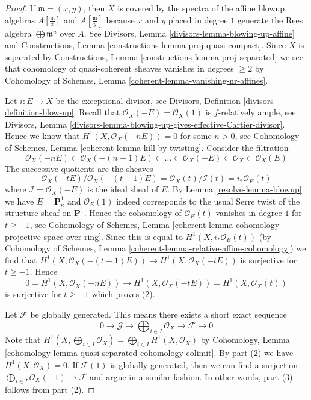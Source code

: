 \begin{proof}

If $\mathfrak m = (x, y)$, then $X$ is covered by the spectra
of the affine blowup algebras $A[\frac{\mathfrak m}{x}]$ and
$A[\frac{\mathfrak m}{y}]$ because $x$ and $y$ placed in degree $1$
generate the Rees algebra $\bigoplus \mathfrak m^n$ over $A$.
See Divisors, Lemma \ref{divisors-lemma-blowing-up-affine} and
Constructions, Lemma \ref{constructions-lemma-proj-quasi-compact}.
Since $X$ is separated by
Constructions, Lemma \ref{constructions-lemma-proj-separated}
we see that cohomology of quasi-coherent sheaves vanishes in
degrees $\geq 2$ by Cohomology of Schemes, Lemma
\ref{coherent-lemma-vanishing-nr-affines}.

\medskip\noindent
Let $i : E \to X$ be the exceptional divisor, see
Divisors, Definition \ref{divisors-definition-blow-up}.
Recall that $\mathcal{O}_X(-E) = \mathcal{O}_X(1)$ is
$f$-relatively ample, see
Divisors, Lemma \ref{divisors-lemma-blowing-up-gives-effective-Cartier-divisor}.
Hence we know that $H^1(X, \mathcal{O}_X(-nE)) = 0$ for some $n > 0$,
see Cohomology of Schemes, Lemma \ref{coherent-lemma-kill-by-twisting}.
Consider the filtration
$$
\mathcal{O}_X(-nE) \subset \mathcal{O}_X(-(n - 1)E) \subset
\ldots \subset \mathcal{O}_X(-E) \subset \mathcal{O}_X \subset \mathcal{O}_X(E)
$$
The successive quotients are the sheaves
$$
\mathcal{O}_X(-t E)/\mathcal{O}_X(-(t + 1)E) =
\mathcal{O}_X(t)/\mathcal{I}(t) =
i_*\mathcal{O}_E(t)
$$
where $\mathcal{I} = \mathcal{O}_X(-E)$ is the ideal sheaf of $E$.
By Lemma \ref{resolve-lemma-blowup} we have $E = \mathbf{P}^1_\kappa$ and
$\mathcal{O}_E(1)$ indeed corresponds to the usual Serre twist of
the structure sheaf on $\mathbf{P}^1$. Hence the cohomology
of $\mathcal{O}_E(t)$ vanishes in degree $1$ for $t \geq -1$, see
Cohomology of Schemes, Lemma
\ref{coherent-lemma-cohomology-projective-space-over-ring}.
Since this is equal to $H^1(X, i_*\mathcal{O}_E(t))$ (by
Cohomology of Schemes, Lemma \ref{coherent-lemma-relative-affine-cohomology})
we find that $H^1(X, \mathcal{O}_X(-(t + 1)E)) \to H^1(X, \mathcal{O}_X(-tE))$
is surjective for $t \geq -1$. Hence
$$
0 = H^1(X, \mathcal{O}_X(-nE))
\longrightarrow
H^1(X, \mathcal{O}_X(-tE)) = H^1(X, \mathcal{O}_X(t))
$$
is surjective for $t \geq -1$ which proves (2).

\medskip\noindent
Let $\mathcal{F}$ be globally generated. This means there exists
a short exact sequence
$$
0 \to \mathcal{G} \to \bigoplus\nolimits_{i \in I} \mathcal{O}_X
\to \mathcal{F} \to 0
$$
Note that $H^1(X, \bigoplus_{i \in I} \mathcal{O}_X) =
\bigoplus_{i \in I} H^1(X, \mathcal{O}_X)$ by
Cohomology, Lemma \ref{cohomology-lemma-quasi-separated-cohomology-colimit}.
By part (2) we have $H^1(X, \mathcal{O}_X) = 0$.
If $\mathcal{F}(1)$ is globally generated, then we can find a
surjection $\bigoplus_{i \in I} \mathcal{O}_X(-1) \to \mathcal{F}$
and argue in a similar fashion.
In other words, part (3) follows from part (2).


\end{proof}
